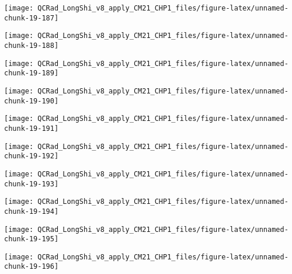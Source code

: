 \documentclass[
  10pt,
  a4paper,oneside]{article}
\begin{document}
\begin{center}\texttt{[image: QCRad\_LongShi\_v8\_apply\_CM21\_CHP1\_files/figure-latex/unnamed-chunk-19-187]} \end{center}

\begin{center}\texttt{[image: QCRad\_LongShi\_v8\_apply\_CM21\_CHP1\_files/figure-latex/unnamed-chunk-19-188]} \end{center}

\begin{center}\texttt{[image: QCRad\_LongShi\_v8\_apply\_CM21\_CHP1\_files/figure-latex/unnamed-chunk-19-189]} \end{center}

\begin{center}\texttt{[image: QCRad\_LongShi\_v8\_apply\_CM21\_CHP1\_files/figure-latex/unnamed-chunk-19-190]} \end{center}

\begin{center}\texttt{[image: QCRad\_LongShi\_v8\_apply\_CM21\_CHP1\_files/figure-latex/unnamed-chunk-19-191]} \end{center}

\begin{center}\texttt{[image: QCRad\_LongShi\_v8\_apply\_CM21\_CHP1\_files/figure-latex/unnamed-chunk-19-192]} \end{center}

\begin{center}\texttt{[image: QCRad\_LongShi\_v8\_apply\_CM21\_CHP1\_files/figure-latex/unnamed-chunk-19-193]} \end{center}

\begin{center}\texttt{[image: QCRad\_LongShi\_v8\_apply\_CM21\_CHP1\_files/figure-latex/unnamed-chunk-19-194]} \end{center}

\begin{center}\texttt{[image: QCRad\_LongShi\_v8\_apply\_CM21\_CHP1\_files/figure-latex/unnamed-chunk-19-195]} \end{center}

\begin{center}\texttt{[image: QCRad\_LongShi\_v8\_apply\_CM21\_CHP1\_files/figure-latex/unnamed-chunk-19-196]} \end{center}
\end{document}

